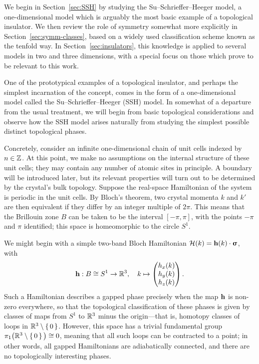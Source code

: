 We begin in Section~\ref{sec:SSH} by studying the Su--Schrieffer--Heeger model, a one-dimensional model which is arguably the most basic example of a topological insulator. We then review the role of symmetry somewhat more explicitly in Section~\ref{sec:symm-classes}, based on a widely used classification scheme known as the tenfold way. In Section~\ref{sec:insulators}, this knowledge is applied to several models in two and three dimensions, with a special focus on those which prove to be relevant to this work.

\label{sec:SSH}

One of the prototypical examples of a topological insulator, and perhaps the simplest incarnation of the concept, comes in the form of a one-dimensional model called the Su--Schrieffer--Heeger (SSH) model. In somewhat of a departure from the usual treatment, we will begin from basic topological considerations and observe how the SSH model arises naturally from studying the simplest possible distinct topological phases. 

Concretely, consider an infinite one-dimensional chain of unit cells indexed by $n\in\mathbb{Z}$. At this point, we make no assumptions on the internal structure of these unit cells; they may contain any number of atomic sites in principle. A boundary will be introduced later, but its relevant properties will turn out to be determined by the crystal's bulk topology. Suppose the real-space Hamiltonian of the system is periodic in the unit cells. By Bloch's theorem, two crystal momenta $k$ and $k'$ are then equivalent if they differ by an integer multiple of $2\pi$. This means that the Brillouin zone $B$ can be taken to be the interval $[-\pi,\pi]$, with the points $-\pi$ and $\pi$ identified; this space is homeomorphic to the circle $S^1$.

We might begin with a simple two-band Bloch Hamiltonian $\mathcal{H}(k) = \vb{h}(k)\cdot\bm{\upsigma}$, with
\[
	\vb{h}: B\cong S^1\to\mathbb{R}^3,\quad k\mapsto\begin{pmatrix}
		h_x(k) \\ h_y(k) \\ h_z(k)
	\end{pmatrix}.
\]
Such a Hamiltonian describes a gapped phase precisely when the map $\vb{h}$ is non-zero everywhere, so that the topological classification of these phases is given by classes of maps from $S^1$ to $\mathbb{R}^3$ minus the origin---that is, homotopy classes of loops in $\mathbb{R}^3\setminus\set{0}$. However, this space has a trivial fundamental group $\pi_1\big(\mathbb{R}^3\setminus\set{0}\big)\cong0$, meaning that all such loops can be contracted to a point; in other words, all gapped Hamiltonians are adiabatically connected, and there are no topologically interesting phases.

